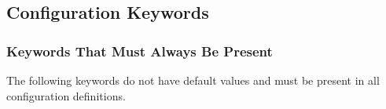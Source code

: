 \begin{itemize}
\end{itemize}

\newpage

\subsection{Configuration Keywords}\label{sec:keywords}

\subsubsection{Keywords That Must Always Be Present}

The following keywords do not have default values and must be present
in all configuration definitions.


